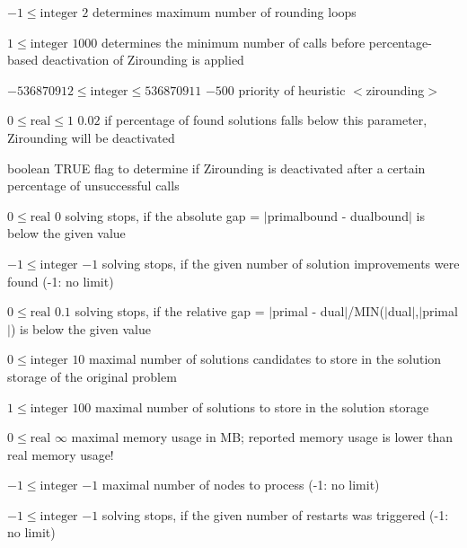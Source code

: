 %
{$-1\leq\textrm{integer}$}%
{$2$}%
{determines maximum number of rounding loops}%
{}

%
{$1\leq\textrm{integer}$}%
{$1000$}%
{determines the minimum number of calls before percentage-based deactivation of Zirounding is applied}%
{}

%
{$-536870912\leq\textrm{integer}\leq536870911$}%
{$-500$}%
{priority of heuristic $<$zirounding$>$}%
{}

%
{$0\leq\textrm{real}\leq1$}%
{$0.02$}%
{if percentage of found solutions falls below this parameter, Zirounding will be deactivated}%
{}

%
{boolean}%
{TRUE}%
{flag to determine if Zirounding is deactivated after a certain percentage of unsuccessful calls}%
{}

%
{$0\leq\textrm{real}$}%
{$0$}%
{solving stops, if the absolute gap = $|$primalbound - dualbound$|$ is below the given value}%
{}

%
{$-1\leq\textrm{integer}$}%
{$-1$}%
{solving stops, if the given number of solution improvements were found (-1: no limit)}%
{}

%
{$0\leq\textrm{real}$}%
{$0.1$}%
{solving stops, if the relative gap = $|$primal - dual$|$/MIN($|$dual$|$,$|$primal$|$) is below the given value}%
{}

%
{$0\leq\textrm{integer}$}%
{$10$}%
{maximal number of solutions candidates to store in the solution storage of the original problem}%
{}

%
{$1\leq\textrm{integer}$}%
{$100$}%
{maximal number of solutions to store in the solution storage}%
{}

%
{$0\leq\textrm{real}$}%
{$\infty$}%
{maximal memory usage in MB; reported memory usage is lower than real memory usage!}%
{}

%
{$-1\leq\textrm{integer}$}%
{$-1$}%
{maximal number of nodes to process (-1: no limit)}%
{}

%
{$-1\leq\textrm{integer}$}%
{$-1$}%
{solving stops, if the given number of restarts was triggered (-1: no limit)}%
{}

